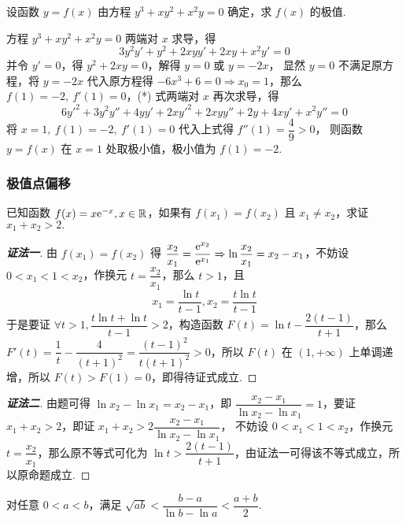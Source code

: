 \begin{example}[2014 数一]
    设函数 $y=f(x)$ 由方程 $y^3+xy^2+x^2y=0$ 确定，求 $f(x)$ 的极值.
\end{example}
\begin{solution}
    方程 $y^3+xy^2+x^2y=0$ 两端对 $x$ 求导，得 
    \begin{equation*}
        3y^2y'+y^2+2xyy'+2xy+x^2y'=0
        \tag{*}
    \end{equation*}
    并令 $y'=0$，得 $y^2+2xy=0$，解得 $y=0$ 或 $y=-2x$，
    显然 $y=0$ 不满足原方程，将 $y=-2x$ 代入原方程得 $-6x^3+6=0\Rightarrow x_0=1$，那么 $f(1)=-2,~f'(1)=0$，(*) 式两端对 $x$ 再次求导，得 
    $$6y'^2+3y^2y''+4yy'+2xy'^2+2xyy''+2y+4xy'+x^2y''=0$$
    将 $x=1,~f(1)=-2,~f'(1)=0$ 代入上式得 $f''(1)=\dfrac{4}{9}>0$，
    则函数 $y=f(x)$ 在 $x=1$ 处取极小值，极小值为 $f(1)=-2.$
\end{solution}

\subsubsection{极值点偏移}

\begin{example}
    已知函数 $f(x)=x\mathrm{e}^{-x},x\in\mathbb{R}$，如果有 $f(x_1)=f(x_2)$ 且 $x_1\neq x_2$，求证 $x_1+x_2>2.$
\end{example}
\begin{proof}[{\songti \textbf{证法一}}]
    由 $f(x_1)=f(x_2)$ 得 $\dfrac{x_2}{x_1}=\dfrac{\mathrm{e}^{x_2}}{\mathrm{e}^{x_1}}\Rightarrow \ln\dfrac{x_2}{x_1}=x_2-x_1$，不妨设 $0<x_1<1<x_2$，作换元 $t=\dfrac{x_2}{x_1}$，那么 $t>1$，且
    $$x_1=\dfrac{\ln t}{t-1},x_2=\dfrac{t\ln t}{t-1}$$
    于是要证 $\forall t>1,\dfrac{t\ln t+\ln t}{t-1}>2$，构造函数 $F(t)=\ln t-\dfrac{2(t-1)}{t+1}$，那么 $F'(t)=\dfrac{1}{t}-\dfrac{4}{(t+1)^2}=\dfrac{(t-1)^2}{t(t+1)^2}>0$，所以 $F(t)$ 在 $(1,+\infty)$ 上单调递增，所以 $F(t)>F(1)=0$，即得待证式成立.
\end{proof}
\begin{proof}[{\songti \textbf{证法二}}]
    由题可得 $\ln x_2-\ln x_1=x_2-x_1$，即 $\dfrac{x_2-x_1}{\ln x_2-\ln x_1}=1$，要证 $x_1+x_2>2$，即证 $x_1+x_2>2\dfrac{x_2-x_1}{\ln x_2-\ln x_1}$，
    不妨设 $0<x_1<1<x_2$，作换元 $t=\dfrac{x_2}{x_1}$，那么原不等式可化为 $\ln t>\dfrac{2(t-1)}{t+1}$，由证法一可得该不等式成立，所以原命题成立.
\end{proof}

\begin{theorem}
    对任意 $0<a<b$，满足 $\sqrt{ab}<\dfrac{b-a}{\ln b-\ln a}<\dfrac{a+b}{2}.$
\end{theorem}

